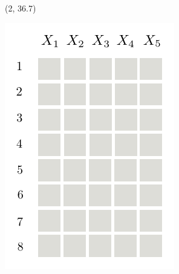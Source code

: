 \documentclass[final]{beamer}
\begin{document}
\begin{frame}{}
  
  \begin{textblock}{80}(2, 36.7)
    \small
    \begin{minipage}[t][][t]{5.67cm}
      \includegraphics[width=\linewidth]{figures/grid-0}
    \end{minipage}\hspace{30pt}\begin{minipage}[t]{4.986cm}

\end{minipage}
\end{textblock}
\end{frame}
\end{document}
